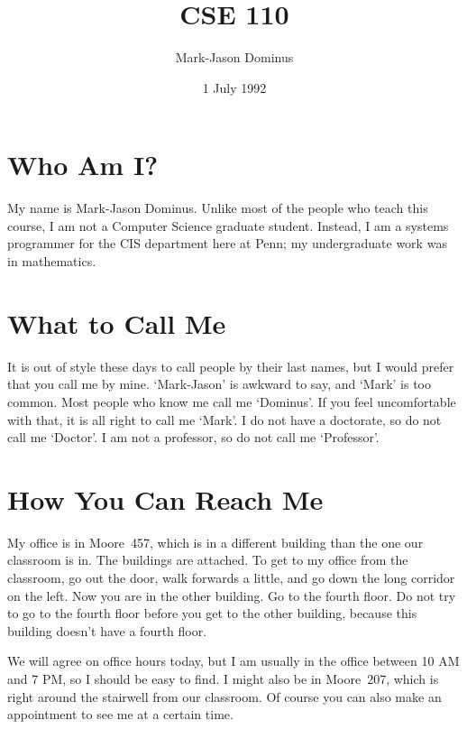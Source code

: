 

\parskip 8pt


\title{CSE 110}
\date{1 July 1992}
\author{Mark-Jason Dominus}



\maketitle

\section{Who Am I?}

My name is Mark-Jason Dominus.  Unlike most of the people who teach this
course, I am not a Computer Science graduate student.  Instead, I am a
systems programmer for the CIS department here at Penn; my undergraduate
work was in mathematics. 

\section {What to Call Me}

It is out of style these days to call people by their last names, but I
would prefer that you call me by mine.  `Mark-Jason' is awkward to say,
and `Mark' is too common.  Most people who know me call me `Dominus'.
If you feel uncomfortable with that, it is all right to call me `Mark'.
I do not have a doctorate, so do not call me `Doctor'.  I am not a
professor, so do not call me `Professor'.

\section{How You Can Reach Me}

    My office is in Moore~457, which is in a different building than the
one our classroom is in.  The buildings are attached.  To get to my
office from the classroom, go out the door, walk forwards a little, and
go down the long corridor on the left.  Now you are in the other
building.  Go to the fourth floor.  Do not try to go to the fourth floor
before you get to the other building, because this building doesn't have
a fourth floor.

    We will agree on office hours today, but I am usually in the office
between 10 AM and 7 PM, so I should be easy to find.  I might also be in
Moore~207, which is right around the stairwell from our classroom.
Of course you can also make an appointment to see me at a certain time.

